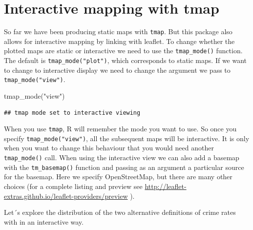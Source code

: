 \documentclass[
]{book}
\newenvironment{Shaded}{\begin{snugshade}}{\end{snugshade}}
\newcommand{\AttributeTok}[1]{\textcolor[rgb]{0.77,0.63,0.00}{#1}}
\newcommand{\FloatTok}[1]{\textcolor[rgb]{0.00,0.00,0.81}{#1}}
\newcommand{\FunctionTok}[1]{\textcolor[rgb]{0.00,0.00,0.00}{#1}}
\newcommand{\NormalTok}[1]{#1}
\newcommand{\SpecialCharTok}[1]{\textcolor[rgb]{0.00,0.00,0.00}{#1}}
\newcommand{\StringTok}[1]{\textcolor[rgb]{0.31,0.60,0.02}{#1}}
\begin{document}
\hypertarget{interactive-mapping-with-tmap}{%
\section{Interactive mapping with tmap}\label{interactive-mapping-with-tmap}}

So far we have been producing static maps with \texttt{tmap}. But this package also allows for interactive mapping by linking with leaflet. To change whether the plotted maps are static or interactive we need to use the \texttt{tmap\_mode()} function. The default is \texttt{tmap\_mode("plot")}, which corresponds to static maps. If we want to change to interactive display we need to change the argument we pass to \texttt{tmap\_mode("view")}.

\begin{Shaded}
\begin{Highlighting}[]
\FunctionTok{tmap\_mode}\NormalTok{(}\StringTok{"view"}\NormalTok{)}
\end{Highlighting}
\end{Shaded}

\begin{verbatim}
## tmap mode set to interactive viewing
\end{verbatim}

When you use \texttt{tmap}, R will remember the mode you want to use. So once you specify \texttt{tmap\_mode("view")}, all the subsequent maps will be interactive. It is only when you want to change this behaviour that you would need another \texttt{tmap\_mode()} call. When using the interactive view we can also add a basemap with the \texttt{tm\_basemap()} function and passing as an argument a particular source for the basemap. Here we specify OpenStreetMap, but there are many other choices (for a complete listing and preview see \url{http://leaflet-extras.github.io/leaflet-providers/preview} ).

Let´s explore the distribution of the two alternative definitions of crime rates with in an interactive way.

\begin{Shaded}
\end{Shaded}
\end{document}
